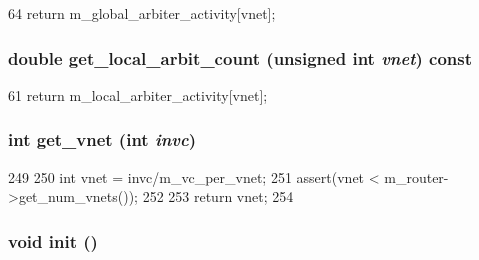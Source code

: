 \begin{DoxyCode}
64     { return m_global_arbiter_activity[vnet]; }
\end{DoxyCode}
\hypertarget{classVCallocator__d_ab4f94aa84ae81a16726cdb768dec7048}{
\subsubsection[{get\_\-local\_\-arbit\_\-count}]{\setlength{\rightskip}{0pt plus 5cm}double get\_\-local\_\-arbit\_\-count (unsigned int {\em vnet}) const}}
\label{classVCallocator__d_ab4f94aa84ae81a16726cdb768dec7048}



\begin{DoxyCode}
61     { return m_local_arbiter_activity[vnet]; }
\end{DoxyCode}
\hypertarget{classVCallocator__d_afdff1bb4dda9168cb4bf8b78aa0cf9d8}{
\subsubsection[{get\_\-vnet}]{\setlength{\rightskip}{0pt plus 5cm}int get\_\-vnet (int {\em invc})}}
\label{classVCallocator__d_afdff1bb4dda9168cb4bf8b78aa0cf9d8}



\begin{DoxyCode}
249 {
250     int vnet = invc/m_vc_per_vnet;
251     assert(vnet < m_router->get_num_vnets());
252 
253     return vnet;
254 }
\end{DoxyCode}
\hypertarget{classVCallocator__d_a02fd73d861ef2e4aabb38c0c9ff82947}{
\subsubsection[{init}]{\setlength{\rightskip}{0pt plus 5cm}void init ()}}
\label{classVCallocator__d_a02fd73d861ef2e4aabb38c0c9ff82947}



